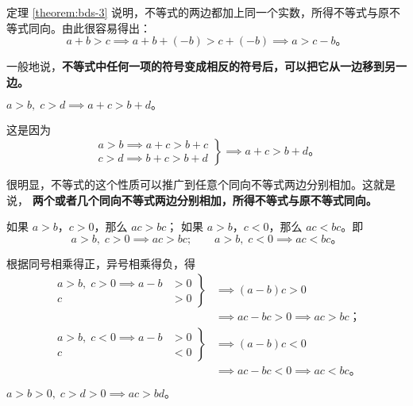 定理 \ref{theorem:bds-3} 说明，不等式的两边都加上同一个实数，所得不等式与原不等式同向。由此很容易得出：
$$ a + b > c \implies a + b + (-b) > c + (-b) \implies a > c - b \text{。} $$

一般地说，\textbf{不等式中任何一项的符号变成相反的符号后，可以把它从一边移到另一边。}

\begin{corollary} \label{corollary:bds-3-1}
    $a > b, \; c > d \implies a + c > b + d \text{。}$
\end{corollary}

这是因为
$$
\left.
    \begin{array}{l}
        a > b \implies a + c > b + c \\
        c > d \implies b + c > b + d
    \end{array}
\right\} \implies a + c > b + d \text{。}
$$

很明显，不等式的这个性质可以推广到任意个同向不等式两边分别相加。这就是说，
\textbf{两个或者几个同向不等式两边分别相加，所得不等式与原不等式同向。}


\begin{theorem} \label{theorem:bds-4}
    如果 $a > b$，$c > 0$，那么 $ac > bc$；
    如果 $a > b$，$c < 0$，那么 $ac < bc$。即
    $$ a > b,\; c > 0 \implies ac > bc ;\qquad a > b,\; c < 0 \implies ac < bc \text{。} $$
\end{theorem}

\zhengming 根据同号相乘得正，异号相乘得负，得
\begin{align*}
    \left.
        \begin{aligned}
            a > b,\; c > 0 \implies a - b &> 0 \\
                                    c &> 0
        \end{aligned}
    \right\} & \implies (a - b)c > 0 \\
             & \implies ac - bc > 0 \implies ac > bc \text{；} \\
    \left.
        \begin{aligned}
            a > b,\; c < 0 \implies a - b &> 0 \\
                                    c &< 0
        \end{aligned}
    \right\} & \implies (a - b)c < 0 \\
            & \implies ac - bc < 0 \implies ac < bc \text{。}
\end{align*}

\setcounter{corollary}{0}
\begin{corollary} \label{corollary:bds-4-1}
    $a > b > 0, \; c > d > 0 \implies ac > bd \text{。}$
\end{corollary}

